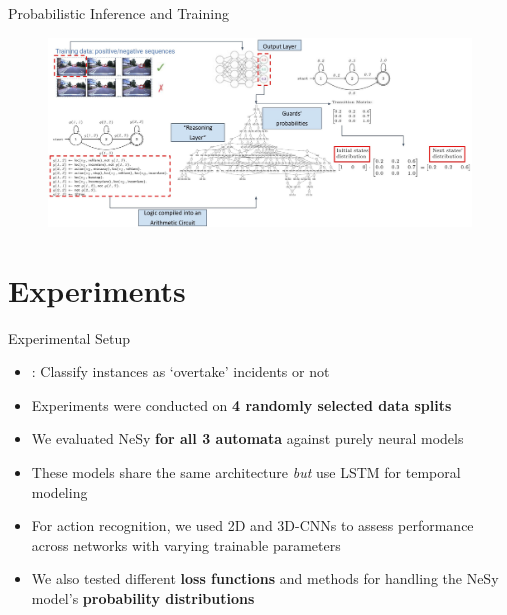 \documentclass[10pt, aspectratio=169]{beamer}
\begin{document}
\begin{frame}{Probabilistic Inference and Training}
    \begin{figure}
        \includegraphics[width=\textwidth]{contents/images/NeSy_training.jpg}
    \end{figure}
\end{frame}


\section{Experiments}
{
    \begin{frame}
        \sectionpage%
    \end{frame}
}


\begin{frame}{Experimental Setup}
    \begin{itemize}
    \setlength{\itemsep}{10pt}
    \item {}: Classify instances as `overtake' incidents or not
    \item Experiments were conducted on \textbf{4 randomly selected data splits}
    \item We evaluated NeSy \textbf{for all 3 automata} against \textcolor{umBlueLighter}{purely neural models}
    \item These models share the same architecture \textit{but} use LSTM for temporal modeling
    \item For action recognition, we used 2D and 3D-CNNs to assess performance across networks with varying trainable parameters
    \item We also tested different \textbf{loss functions} and methods for handling the NeSy model's \textbf{probability distributions}
\end{itemize}
\end{frame}
\end{document}
